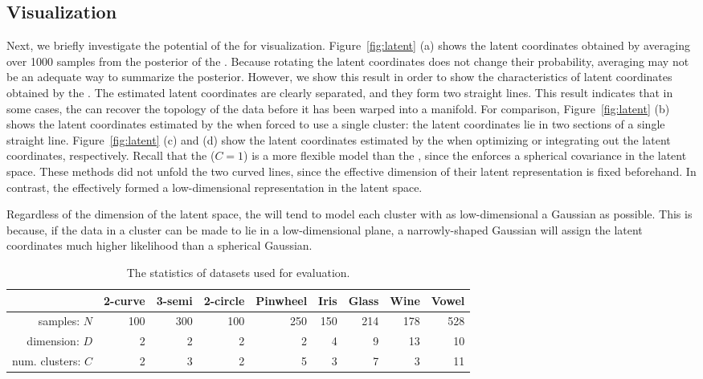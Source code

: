 \subsection{Visualization}
Next, we briefly investigate the potential of the \iwmm{} for visualization.  Figure~\ref{fig:latent} (a) shows the latent coordinates obtained by averaging over 1000 samples from the posterior of the \iwmm{}.
Because rotating the latent coordinates does not change their probability, averaging may not be an adequate way to summarize the posterior.
However, we show this result in order to 
show the characteristics of latent coordinates obtained by the \iwmm{}.
The estimated latent coordinates are clearly separated, and they form two straight lines.
This result indicates that in some cases, the \iwmm{} can recover the topology of the data before it has been warped into a manifold.
For comparison, Figure~\ref{fig:latent} (b) shows the latent coordinates 
estimated by the \iwmm{} when forced to use a single cluster: the latent coordinates lie in two sections of a single straight line.
Figure~\ref{fig:latent} (c) and (d) show the latent coordinates 
estimated by the \gplvm{} when optimizing or integrating out the latent coordinates, respectively.  
Recall that the \iwmm{} ($C=1$) is a more flexible model than the \gplvm{}, since the \gplvm{} enforces a spherical covariance in the latent space.
These methods did not unfold the two curved lines, since the effective dimension of their latent representation is fixed beforehand.
In contrast, the \iwmm{} effectively formed a low-dimensional representation in the latent space. 

Regardless of the dimension of the latent space, the \iwmm{} will tend to model each cluster with as low-dimensional a Gaussian as possible. 
This is because, if the data in a cluster can be made to lie in a low-dimensional plane, a narrowly-shaped Gaussian will assign the latent coordinates much higher likelihood than a spherical Gaussian.

\begin{table*}[ht!]
\centering
\caption[Datasets used for evaluation of the \siwmm{}]
{The statistics of datasets used for evaluation.}
\label{tab:statistics}
\begin{tabular}{rrrrrrrrr}
\hline
 & 2-curve & 3-semi & 2-circle & Pinwheel & Iris  & Glass  & Wine  & Vowel  \\
\hline
samples: $N$ & 100 & 300 & 100 & 250 & 150 & 214 & 178 & 528 \\
dimension: $D$ & 2 & 2 & 2 & 2 & 4 & 9 & 13 & 10 \\
num. clusters: $C$ & 2 & 3 & 2 & 5 & 3 & 7 & 3 & 11 \\
\hline
\end{tabular}
\end{table*}

